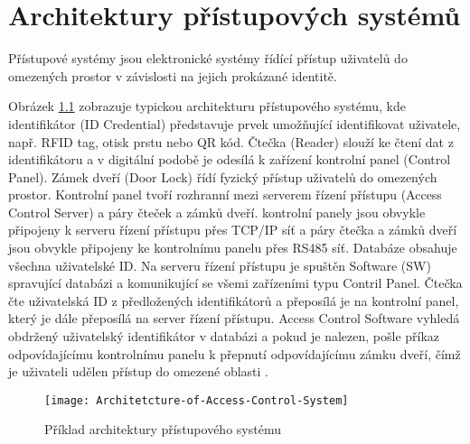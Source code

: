 \chapter{Architektury přístupových systémů}
Přístupové systémy jsou elektronické systémy řídící přístup uživatelů do omezených prostor v závislosti na jejich prokázané identitě. 
\DIFaddbegin {}\DIFaddend 


Obrázek \ref{fig:Access control system architecture} zobrazuje typickou architekturu přístupového systému, kde identifikátor (ID Credential) představuje prvek umožňující identifikovat uživatele, např. RFID tag, otisk prstu nebo QR kód. 
Čtečka (Reader) slouží ke čtení dat z identifikátoru a v digitální podobě je odesílá k zařízení kontrolní panel (Control Panel).
Zámek dveří (Door Lock) řídí fyzický přístup uživatelů do omezených prostor. 
Kontrolní panel tvoří rozhranní mezi serverem řízení přístupu (Access Control Server) a páry čteček a zámků dveří.
kontrolní panely jsou obvykle připojeny k serveru řízení přístupu přes TCP/IP síť a páry čtečka a zámků dveří jsou obvykle připojeny ke kontrolnímu panelu přes RS485 síť. Databáze obsahuje všechna uživatelské ID.
Na serveru řízení přístupu je spuštěn Software (SW) spravující databázi a komunikující se všemi zařízeními typu Contril Panel.
Čtečka čte uživatelská ID z předložených identifikátorů a přeposílá je na kontrolní panel, který je dále přeposílá na server řízení přístupu. 
Access Control Software vyhledá obdržený uživatelský identifikátor v databázi a pokud je nalezen, pošle příkaz odpovídajícímu kontrolnímu panelu k přepnutí odpovídajícímu zámku dveří, čímž je uživateli udělen přístup do omezené oblasti \cite{accessControlSystem_eiprocus}.


\begin{figure}[!h]
    \centering
    \DIFdelbeginFL %
\DIFdelendFL \DIFaddbeginFL \texttt{[image: Architetcture-of-Access-Control-System]}
    \DIFaddendFL \caption{Příklad architektury přístupového systému \cite{accessControlSystem_eiprocus}}
    \label{fig:Access control system architecture}
\end{figure}
\DIFaddbegin 

 \DIFaddend